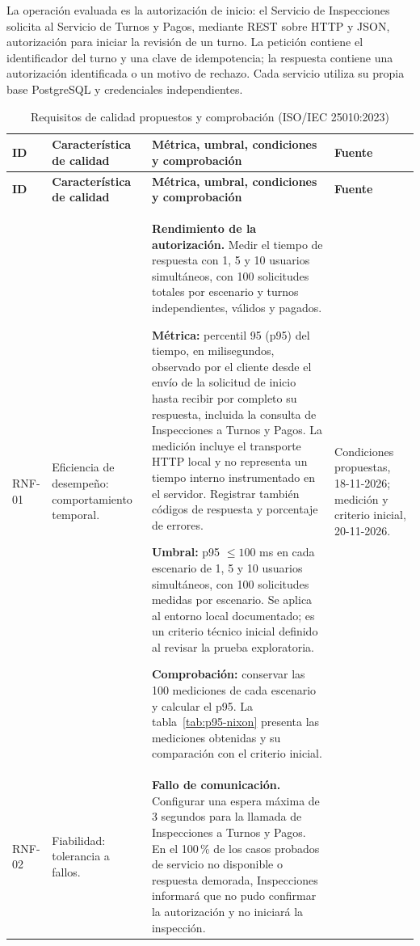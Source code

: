\documentclass[11pt,a4paper]{article}
\begin{document}
	La operación evaluada es la autorización de inicio: el Servicio de Inspecciones solicita al Servicio de Turnos y Pagos, mediante REST sobre HTTP y JSON, autorización para iniciar la revisión de un turno. La petición contiene el identificador del turno y una clave de idempotencia; la respuesta contiene una autorización identificada o un motivo de rechazo. Cada servicio utiliza su propia base PostgreSQL y credenciales independientes.
	
	\begin{xltabular}{\textwidth}{lL{3.6cm}XL{2cm}}
		\caption{Requisitos de calidad propuestos y comprobación (ISO/IEC 25010:2023)}\label{tab:rnf}\\
		\toprule
		\textbf{ID} & \textbf{Característica de calidad} & \textbf{Métrica, umbral, condiciones y comprobación} & \textbf{Fuente} \\
		\midrule
		\endfirsthead
		\toprule
		\textbf{ID} & \textbf{Característica de calidad} & \textbf{Métrica, umbral, condiciones y comprobación} & \textbf{Fuente} \\
		\midrule
		\endhead
		\bottomrule
		\endfoot
		RNF-01 & Eficiencia de desempeño: comportamiento temporal. &
		\textbf{Rendimiento de la autorización.} Medir el tiempo de respuesta con 1, 5 y 10 usuarios simultáneos, con 100 solicitudes totales por escenario y turnos independientes, válidos y pagados.\par
		\textbf{Métrica:} percentil 95 (p95) del tiempo, en milisegundos, observado por el cliente desde el envío de la solicitud de inicio hasta recibir por completo su respuesta, incluida la consulta de Inspecciones a Turnos y Pagos. La medición incluye el transporte HTTP local y no representa un tiempo interno instrumentado en el servidor. Registrar también códigos de respuesta y porcentaje de errores.\par
		\textbf{Umbral:} p95 $\leq 100$ ms en cada escenario de 1, 5 y 10 usuarios simultáneos, con 100 solicitudes medidas por escenario. Se aplica al entorno local documentado; es un criterio técnico inicial definido al revisar la prueba exploratoria.\par
		\textbf{Comprobación:} conservar las 100 mediciones de cada escenario y calcular el p95. La tabla~\ref{tab:p95-nixon} presenta las mediciones obtenidas y su comparación con el criterio inicial. &
		Condiciones propuestas, 18-11-2026; medición y criterio inicial, 20-11-2026. \\
		RNF-02 & Fiabilidad: tolerancia a fallos. &
		\textbf{Fallo de comunicación.} Configurar una espera máxima de 3 segundos para la llamada de Inspecciones a Turnos y Pagos. En el 100\,\% de los casos probados de servicio no disponible o respuesta demorada, Inspecciones informará que no pudo confirmar la autorización y no iniciará la inspección.\par

\end{xltabular}
\end{document}
